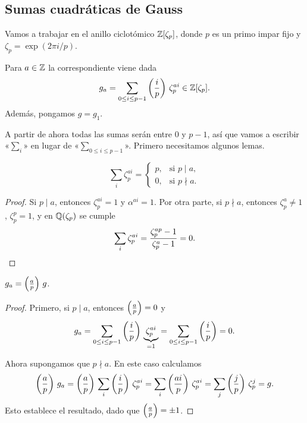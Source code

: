 \subsection{Sumas cuadráticas de Gauss}

Vamos a trabajar en el anillo ciclotómico $\mathbb{Z} [\zeta_p]$, donde $p$ es un primo
impar fijo y $\zeta_p = \exp (2\pi i/p)$.

\begin{definicion}
  Para $a \in \mathbb{Z}$ la  correspondiente viene dada
  $$g_a = \sum_{0 \le i \le p-1} \left(\frac{i}{p}\right) \, \zeta_p^{ai} \in \mathbb{Z} [\zeta_p].$$
  Además, pongamos $g = g_1$.
\end{definicion}

A partir de ahora todas las sumas serán entre $0$ y $p-1$, así que vamos
a escribir «$\sum_i$» en lugar de «$\sum_{0 \le i \le p-1}$».
Primero necesitamos algunos lemas.

\begin{lema}
  \label{lema:QR-1}
  \[ \sum_i \zeta_p^{ai} = \begin{cases}
    p, & \text{si } p \mid a,\\
    0, & \text{si } p \nmid a.
  \end{cases} \]

  \begin{proof}
    Si $p \mid a$, entonces $\zeta_p^{ai} = 1$ y $\alpha^{ai} = 1$.
    Por otra parte, si $p \nmid a$, entonces $\zeta_p^a \ne 1$, $\zeta_p^p = 1$,
    y en $\mathbb{Q} (\zeta_p)$ se cumple
    \[ \sum_i \zeta_p^{ai} = \frac{\zeta_p^{ap} - 1}{\zeta_p^a - 1} = 0. \qedhere \]
  \end{proof}
\end{lema}

\begin{lema}
  \label{lema:QR-2}
  $g_a = \left(\frac{a}{p}\right)\,g$.

  \begin{proof}
    Primero, si $p\mid a$, entonces $\left(\frac{a}{p}\right) = 0$ y
    \[ g_a =
       \sum_{0 \le i \le p-1} \left(\frac{i}{p}\right) \, \underbrace{\zeta_p^{ai}}_{= 1} =
       \sum_{0 \le i \le p-1} \left(\frac{i}{p}\right) = 0. \]

    Ahora supongamos que $p \nmid a$. En este caso calculamos
    \[ \left(\frac{a}{p}\right)\,g_a =
       \left(\frac{a}{p}\right)\,\sum_i \left(\frac{i}{p}\right)\,\zeta_p^{ai} =
       \sum_i \left(\frac{ai}{p}\right)\,\zeta_p^{ai} =
       \sum_j \left(\frac{j}{p}\right)\,\zeta_p^{j} = g. \]
    Esto establece el resultado, dado que $\left(\frac{a}{p}\right) = \pm 1$.
  \end{proof}
\end{lema}

